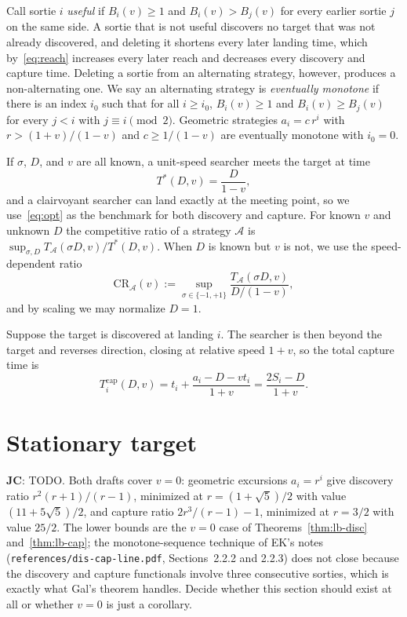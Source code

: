 \documentclass[runningheads,envcountsame,envcountsect]{llncs}
\newcommand\JC[1]{{\color{Maroon} \textbf{JC}: #1}}
\newcommand{\CR}{\mathrm{CR}}
\newcommand{\capt}{\mathrm{cap}}
\newcommand{\opt}{T^{*}}
\begin{document}
Call sortie $i$ \emph{useful} if $B_i(v) \geq 1$ and $B_i(v) > B_j(v)$ for every earlier sortie $j$ on the same side. A sortie that is not useful discovers no target that was not already discovered, and deleting it shortens every later landing time, which by~\eqref{eq:reach} increases every later reach and decreases every discovery and capture time. Deleting a sortie from an alternating strategy, however, produces a non-alternating one. We say an alternating strategy is \emph{eventually monotone} if there is an index $i_0$ such that for all $i \geq i_0$, $B_i(v) \geq 1$ and $B_i(v) \geq B_j(v)$ for every $j < i$ with $j \equiv i \pmod 2$. Geometric strategies $a_i = c\, r^i$ with $r > (1+v)/(1-v)$ and $c \geq 1/(1-v)$ are eventually monotone with $i_0 = 0$.

If $\sigma$, $D$, and $v$ are all known, a unit-speed searcher meets the target at time
\begin{equation}\label{eq:opt}
  \opt(D, v) = \frac{D}{1 - v},
\end{equation}
and a clairvoyant searcher can land exactly at the meeting point, so we use~\eqref{eq:opt} as the benchmark for both discovery and capture. For known $v$ and unknown $D$ the competitive ratio of a strategy $\mathcal{A}$ is $\sup_{\sigma, D} T_{\mathcal{A}}(\sigma D, v) / \opt(D, v)$. When $D$ is known but $v$ is not, we use the speed-dependent ratio
\[
  \CR_{\mathcal{A}}(v) := \sup_{\sigma \in \{-1,+1\}} \frac{T_{\mathcal{A}}(\sigma D, v)}{D/(1-v)} ,
\]
and by scaling we may normalize $D = 1$.

Suppose the target is discovered at landing $i$. The searcher is then beyond the target and reverses direction, closing at relative speed $1 + v$, so the total capture time is
\begin{equation}\label{eq:capture-time}
  T_i^{\capt}(D, v) = t_i + \frac{a_i - D - v t_i}{1 + v} = \frac{2 S_i - D}{1 + v} .
\end{equation}

\FloatBarrier
\section{Stationary target}\label{sec:static}

\JC{TODO. Both drafts cover $v = 0$: geometric excursions $a_i = r^i$ give discovery ratio $r^2(r+1)/(r-1)$, minimized at $r = (1+\sqrt5)/2$ with value $(11+5\sqrt5)/2$, and capture ratio $2r^3/(r-1) - 1$, minimized at $r = 3/2$ with value $25/2$. The lower bounds are the $v = 0$ case of Theorems~\ref{thm:lb-disc} and~\ref{thm:lb-cap}; the monotone-sequence technique of EK's notes (\texttt{references/dis-cap-line.pdf}, Sections~2.2.2 and 2.2.3) does not close because the discovery and capture functionals involve three consecutive sorties, which is exactly what Gal's theorem handles. Decide whether this section should exist at all or whether $v = 0$ is just a corollary.}
\end{document}
